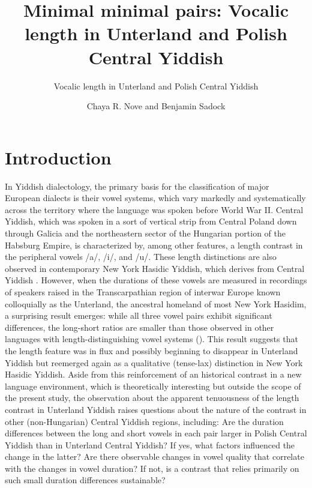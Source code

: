 \documentclass[output=paper,colorlinks,citecolor=brown]{langscibook}
\author{Chaya R. Nove\orcid{}\affiliation{Brown University} and Benjamin Sadock\orcid{}\affiliation{Independent researcher}}
\title{Minimal minimal pairs: Vocalic length in Unterland and Polish Central Yiddish}
\subtitle{Vocalic length in Unterland and Polish Central Yiddish}
\begin{document}
\maketitle
\label{chap:nove}
\graphicspath{{figures/nove}}


\section{Introduction}
\label{sec:nove:1}
In Yiddish dialectology, the primary basis for the classification of major European dialects is their vowel systems, which vary markedly and systematically across the territory where the language was spoken before World War II. Central Yiddish, which was spoken in a sort of vertical strip from Central Poland down through Galicia and the northeastern sector of the Hungarian portion of the Habsburg Empire, is characterized by, among other features, a length contrast in the peripheral vowels \mbox{/a/}, \mbox{/i/}, and \mbox{/u/}. These length distinctions are also observed in contemporary New York Hasidic Yiddish, which derives from Central Yiddish \citep{Nove2021}. However, when the durations of these vowels are measured in recordings of speakers raised in the Transcarpathian region of interwar Europe known colloquially as the Unterland, the ancestral homeland of most New York Hasidim, a surprising result emerges: while all three vowel pairs exhibit significant differences, the long-short ratios are smaller than those observed in other languages with length-distinguishing vowel systems (\citealt[92]{Nove2021}). This result suggests that the length feature was in flux and possibly beginning to disappear in Unterland Yiddish but reemerged again as a qualitative (tense-lax) distinction in New York Hasidic Yiddish. Aside from this reinforcement of an historical contrast in a new language environment, which is theoretically interesting but outside the scope of the present study, the observation about the apparent tenuousness of the length contrast in Unterland Yiddish raises questions about the nature of the contrast in other (non-Hungarian) Central Yiddish regions, including: Are the duration differences between the long and short vowels in each pair larger in Polish Central Yiddish than in Unterland Central Yiddish? If yes, what factors influenced the change in the latter? Are there observable changes in vowel quality that correlate with the changes in vowel duration? If not, is a contrast that relies primarily on such small duration differences sustainable?
\end{document}
